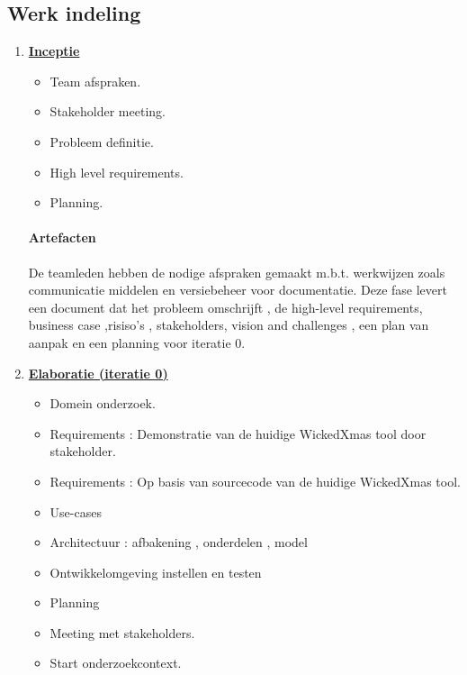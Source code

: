 
\subsection{Werk indeling}
\begin{enumerate}
\item \underline{\textbf{Inceptie}}
		\begin{itemize}
			\item Team afspraken.
			\item Stakeholder meeting.
			\item Probleem definitie.
			\item High level requirements.
			\item Planning.
		\end{itemize}
		\paragraph{Artefacten}
		De teamleden hebben de nodige afspraken gemaakt m.b.t. werkwijzen zoals
		communicatie middelen en versiebeheer voor documentatie. Deze fase levert
		een document dat het probleem omschrijft , de high-level requirements, business
		case ,risiso's , stakeholders, vision and challenges , een plan van aanpak en
		een planning voor iteratie 0.

\item \underline{\textbf{Elaboratie (iteratie 0)}}
	\begin{itemize}
		\item Domein onderzoek.
		\item Requirements : Demonstratie van de huidige WickedXmas tool door stakeholder.
		\item Requirements : Op basis van sourcecode van de huidige WickedXmas tool.
		\item Use-cases
		\item Architectuur : afbakening , onderdelen , model
		\item Ontwikkelomgeving instellen en testen
		\item Planning
		\item Meeting met stakeholders.
		\item Start onderzoekcontext.
	\end{itemize}

\end{enumerate}
